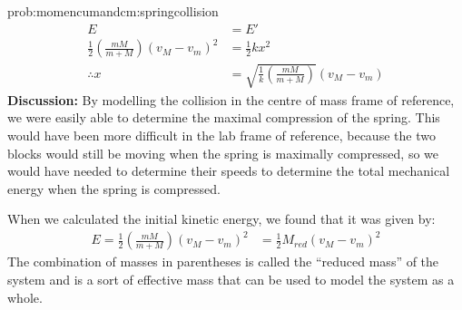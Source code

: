 \begin{solution}{prob:momencumandcm:springcollision}
\begin{align*}
E &= E' \\
\frac{1}{2} \left(\frac{mM}{m+M}\right)(v_M-v_m)^2 &= \frac{1}{2}kx^2\\
\therefore x &= \sqrt{\frac{1}{k} \left(\frac{mM}{m+M}\right)}(v_M-v_m)
\end{align*}
\textbf{Discussion:} By modelling the collision in the centre of mass frame of reference, we were easily able to determine the maximal compression of the spring. This would have been more difficult in the lab frame of reference, because the two blocks would still be moving when the spring is maximally compressed, so we would have needed to determine their speeds to determine the total mechanical energy when the spring is compressed.

When we calculated the initial kinetic energy, we found that it was given by:
\begin{align*}
E=\frac{1}{2} \left(\frac{mM}{m+M}\right)(v_M-v_m)^2 &=\frac{1}{2}M_{red}(v_M-v_m)^2
\end{align*}
The combination of masses in parentheses is called the ``reduced mass'' of the system and is a sort of effective mass that can be used to model the system as a whole. 
\end{solution}


